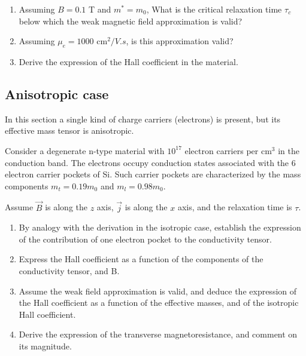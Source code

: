 \begin{enumerate}[label=(\roman*)]
\item Assuming $B=0.1$ T and $m^* = m_0$, What is the critical relaxation
  time $\tau_c$ below which the weak magnetic field approximation is valid?
\item Assuming $\mu_e = 1000 \text{ cm}^2/V.s$, is this approximation valid?
\item Derive the expression of the Hall coefficient in the material.
\end{enumerate}

\subsection*{Anisotropic case}

In this section a single kind of charge carriers (electrons) is
present, but its effective mass tensor is
anisotropic.

Consider a degenerate
n-type material with $10^{17}$ electron carriers per cm$^3$ in the
conduction band. The electrons occupy conduction states associated
with the 6 electron carrier pockets of
Si. Such carrier pockets are characterized by the mass components
$m_t = 0.19 m_0$ and $m_l = 0.98 m_0$.

Assume $\vec{B}$ is along the $z$ axis, $\vec{j}$ is along the $x$
axis, and the relaxation time is $\tau$.

\begin{enumerate}[label=(\roman*)]
\item By analogy with the derivation in the isotropic case, establish the
  expression of the contribution of one electron pocket to the
  conductivity tensor.
\item Express the Hall coefficient as a function of the components of
  the conductivity tensor, and B.
\item Assume the weak field approximation is valid, and deduce the
  expression of the Hall coefficient as a function of the effective
  masses, and of the isotropic Hall coefficient.
\item Derive the expression of the transverse magnetoresistance, and
  comment on its magnitude.
\end{enumerate}


